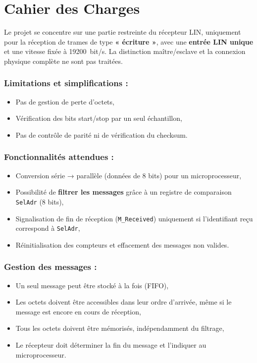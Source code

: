 \section{Cahier des Charges}

Le projet se concentre sur une partie restreinte du récepteur LIN, uniquement pour la réception de trames de type \textbf{« écriture »}, avec une \textbf{entrée LIN unique} et une vitesse fixée à \SI{19200}{bit/s}. La distinction maître/esclave et la connexion physique complète ne sont pas traitées.

\subsubsection*{Limitations et simplifications :}
\begin{itemize}
    \item Pas de gestion de perte d'octets,
    \item Vérification des bits start/stop par un seul échantillon,
    \item Pas de contrôle de parité ni de vérification du checksum.
\end{itemize}

\subsubsection*{Fonctionnalités attendues :}
\begin{itemize}
    \item Conversion série → parallèle (données de 8 bits) pour un microprocesseur,
    \item Possibilité de \textbf{filtrer les messages} grâce à un registre de comparaison \texttt{SelAdr} (8 bits),
    \item Signalisation de fin de réception (\texttt{M\_Received}) uniquement si l'identifiant reçu correspond à \texttt{SelAdr},
    \item Réinitialisation des compteurs et effacement des messages non valides.
\end{itemize}

\subsubsection*{Gestion des messages :}
\begin{itemize}
    \item Un seul message peut être stocké à la fois (FIFO),
    \item Les octets doivent être accessibles dans leur ordre d'arrivée, même si le message est encore en cours de réception,
    \item Tous les octets doivent être mémorisés, indépendamment du filtrage,
    \item Le récepteur doit déterminer la fin du message et l'indiquer au microprocesseur.
\end{itemize}

